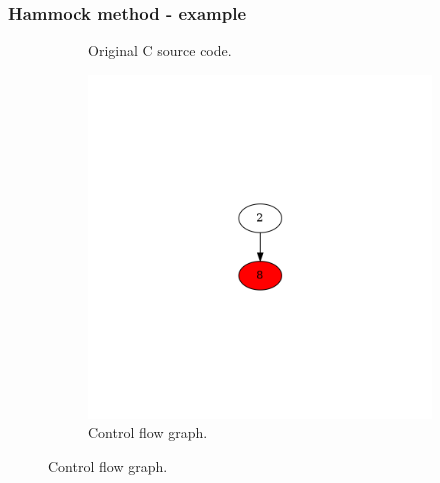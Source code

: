 \documentclass[aspectratio=1610]{beamer}
\begin{document}
\begin{frame}
	\frametitle{Hammock method - example}
	\begin{figure}[htbp]
		\centering
		\begin{subfigure}[b]{0.30\textwidth}
			\centering
			
			\caption{Original C source code.}
		\end{subfigure}
		\begin{subfigure}[b]{0.50\textwidth}
			\centering
			\includegraphics[height=0.6\paperheight]{inc/methods/hammock/example/without-break/main_0003b.png}
			\caption{Control flow graph.}
		\end{subfigure}
	\end{figure}
\end{frame}
\end{document}
